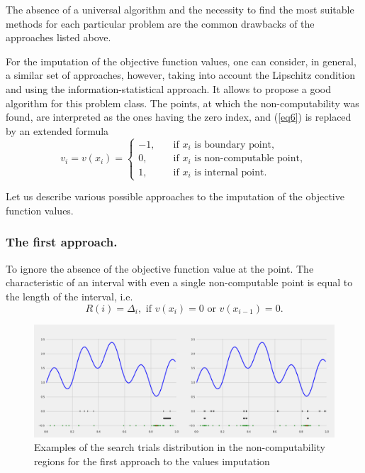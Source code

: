 \documentclass[runningheads]{llncs}
\begin{document}
The absence of a universal algorithm and the necessity to find the most suitable methods for each particular problem are the common drawbacks of the approaches listed above.

For the imputation of the objective function values, one can consider, in general, a similar set of approaches, however, taking into account the Lipschitz condition and using the information-statistical approach. It allows to propose a good algorithm for this problem class. The points, at which the non-computability was found, are interpreted as the ones having the zero index, and (\ref{eq6}) is replaced by an extended formula
\begin{equation}\label{eq12} 
v_i=v(x_i)=
  \begin{cases}
    -1, & {\quad \text{if } x_i \text{ is boundary point}},\\
    0, & {\quad \text{if } x_i \text{ is non-computable point}},\\
    1, & {\quad \text{if } x_i \text{ is internal point}}.
  \end{cases}
\end{equation}

Let us describe various possible approaches to the imputation of the objective function values.

\subsubsection{The first approach.} To ignore the absence of the objective function value at the point. The characteristic of an interval with even a single non-computable point is equal to the length of the interval, i.e.
\begin{equation}\label{eq13} 
R(i)=\Delta _i, \text{ if } v(x_i)=0 \text{ or } v(x_{i-1})=0.
\end{equation}

\begin{figure}
\includegraphics[width=\textwidth]{fig1.png}
\caption{Examples of the search trials distribution in the non-computability regions for the first approach to the values imputation} \label{fig1}
\end{figure}
\end{document}
